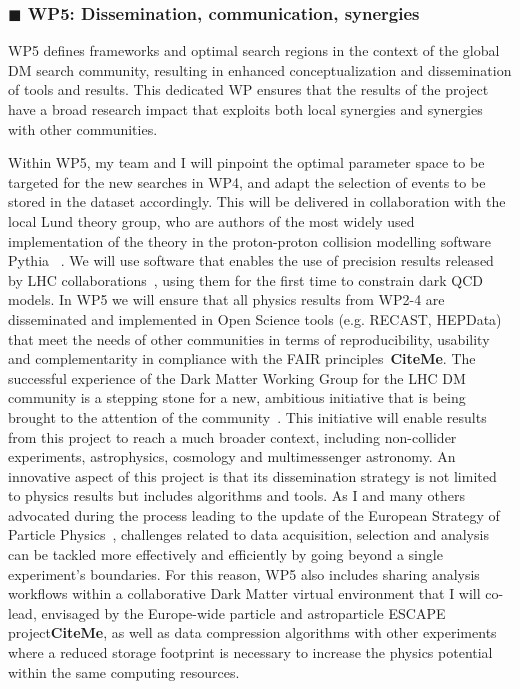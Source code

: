 \documentclass[11pt,a4paper]{article}
\begin{document}
\subsubsection*{\color{violet} $\blacksquare$ \color{black} WP5: Dissemination, communication, synergies}

WP5 defines frameworks and optimal search regions in the context of the global DM search community, resulting in enhanced conceptualization and dissemination of tools and results.
This dedicated WP ensures that the results of the project have a broad research impact that exploits both local synergies and synergies with other communities. 

Within WP5, my team and I will pinpoint the optimal parameter space to be targeted for the new searches in WP4, and adapt the selection of events to be stored in the dataset accordingly. 
This will be delivered in collaboration with the local Lund theory group, who are authors of the most widely used implementation of the theory in the proton-proton collision modelling software Pythia ~\cite{Sjostrand:2007gs}. 
We will use software that enables the use of precision results released by LHC collaborations~\cite{Butterworth:2016sqg}, using them for the first time to constrain dark QCD models. 
In WP5 we will ensure that all physics results from WP2-4 are disseminated and implemented in Open Science tools (e.g. RECAST, HEPData) that meet the needs of other communities in terms of reproducibility, usability and complementarity in compliance with the FAIR principles~\textbf{CiteMe}. 
The successful experience of the Dark Matter Working Group for the LHC DM community is a stepping stone for a new, ambitious initiative that is being brought to the attention of the community~\cite{iDMEu}. 
This initiative will enable results from this project to reach a much broader context, including non-collider experiments, astrophysics, cosmology and multimessenger astronomy. 
An innovative aspect of this project is that its dissemination strategy is not limited to physics results but includes algorithms and tools. 
As I and many others advocated during the process leading to the update of the European Strategy of Particle Physics~\cite{Doglioni:2019fza}, challenges related to data acquisition, selection and analysis can be tackled more effectively and efficiently by going beyond a single experiment's boundaries. 
For this reason, WP5 also includes sharing analysis workflows within a collaborative Dark Matter virtual environment that I will co-lead, envisaged by the Europe-wide particle and astroparticle ESCAPE project\textbf{CiteMe}, as well as data compression algorithms with other experiments where a reduced storage footprint is necessary to increase the physics potential within the same computing resources. %
\end{document}
